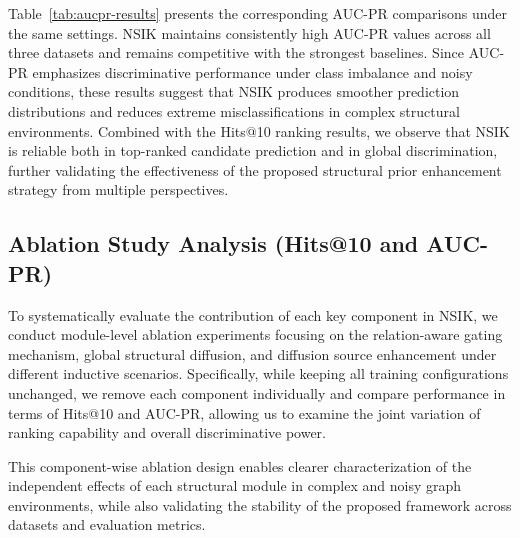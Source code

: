 \documentclass[preprint,12pt]{elsarticle}
\begin{document}
Table~\ref{tab:aucpr-results} presents the corresponding AUC-PR comparisons under the same settings. NSIK maintains consistently high AUC-PR values across all three datasets and remains competitive with the strongest baselines. Since AUC-PR emphasizes discriminative performance under class imbalance and noisy conditions, these results suggest that NSIK produces smoother prediction distributions and reduces extreme misclassifications in complex structural environments. Combined with the Hits@10 ranking results, we observe that NSIK is reliable both in top-ranked candidate prediction and in global discrimination, further validating the effectiveness of the proposed structural prior enhancement strategy from multiple perspectives.



\subsection{Ablation Study Analysis (Hits@10 and AUC-PR)}

To systematically evaluate the contribution of each key component in NSIK, we conduct module-level ablation experiments focusing on the relation-aware gating mechanism, global structural diffusion, and diffusion source enhancement under different inductive scenarios. Specifically, while keeping all training configurations unchanged, we remove each component individually and compare performance in terms of Hits@10 and AUC-PR, allowing us to examine the joint variation of ranking capability and overall discriminative power.

This component-wise ablation design enables clearer characterization of the independent effects of each structural module in complex and noisy graph environments, while also validating the stability of the proposed framework across datasets and evaluation metrics.
\end{document}

